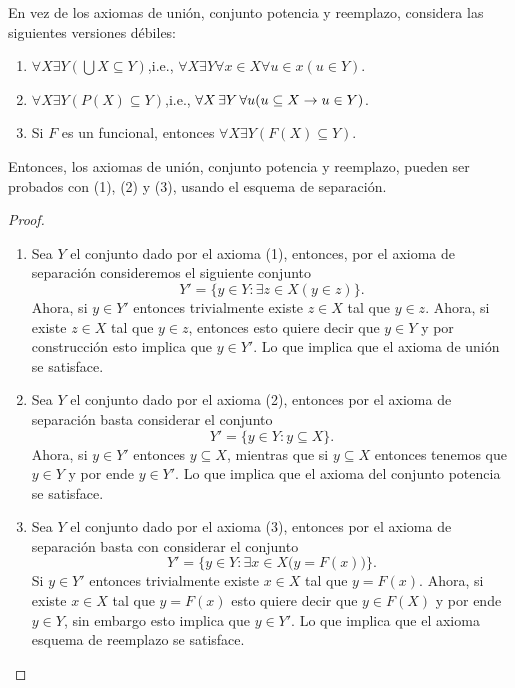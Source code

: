 \begin{exercise}[1.15]
  En vez de los axiomas de unión, conjunto potencia y reemplazo, considera las siguientes versiones débiles:
  \begin{enumerate}[label=(\arabic*)]
    \item $\forall X \exists Y (\bigcup X \subseteq Y)$,\qquad i.e., $\forall X \exists Y  \forall x \in X  \forall u \in x  (u \in Y)$.
    
    \item $\forall X  \exists Y  (P(X) \subseteq Y)$,\qquad i.e., $\forall X \exists Y  \forall u  (u \subseteq X \lthen u \in Y)$.
    
    \item Si $F$ es un funcional, entonces $\forall X  \exists Y  (F(X) \subseteq Y)$.
  \end{enumerate}
  Entonces, los axiomas de unión, conjunto potencia y reemplazo, pueden ser probados con (1), (2) y (3), usando el esquema de separación.
\end{exercise}
\begin{proof}~
  \begin{enumerate}
    \item Sea $Y$ el conjunto dado por el axioma (1), entonces, por el axioma de separación consideremos el siguiente conjunto
    \[
        Y' = \{y \in Y : \exists z \in X (y \in z) \}.
    \]
    Ahora, si $y \in Y'$ entonces trivialmente existe $z \in X$ tal que $y \in z$. Ahora, si existe $z \in X$ tal que $y \in z$, entonces esto quiere decir que $y \in Y$ y por construcción esto implica que $y \in Y'$. Lo que implica que el axioma de unión se satisface.

    \item Sea $Y$ el conjunto dado por el axioma (2), entonces por el axioma de separación basta considerar el conjunto
    \[
      Y' = \{y \in Y : y \subseteq X\}.
    \]
    Ahora, si $y \in Y'$ entonces $y \subseteq X$, mientras que si $y \subseteq X$ entonces tenemos que $y \in Y$ y por ende $y \in Y'$. Lo que implica que el axioma del conjunto potencia se satisface.

    \item Sea $Y$ el conjunto dado por el axioma (3), entonces por el axioma de separación basta con considerar el conjunto
    \[
      Y' = \bigl\{y \in Y : \exists x \in X \bigl( y = F(x) \bigr) \bigr\}.
    \]
    Si $y \in Y'$ entonces trivialmente existe $x \in X$ tal que $y = F(x)$. Ahora, si existe $x \in X$ tal que $y = F(x)$ esto quiere decir que $y \in F(X)$ y por ende $y \in Y$, sin embargo esto implica que $y \in Y'$. Lo que implica que el axioma esquema de reemplazo se satisface.
  \end{enumerate}
\end{proof}